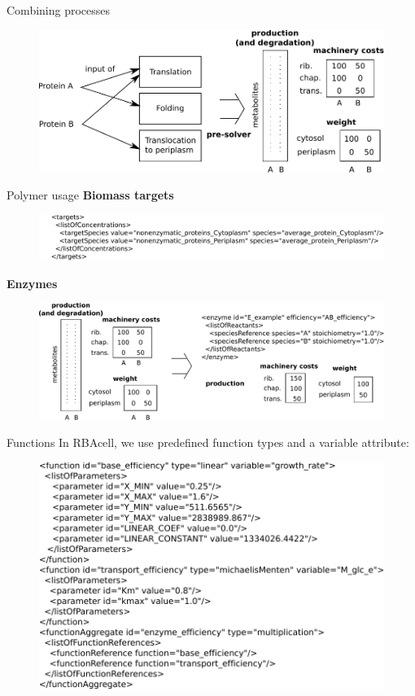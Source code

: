 \documentclass{beamer}
\begin{document}
\begin{frame}{Combining processes}
  \begin{figure}
    \centering
    \includegraphics[width=\linewidth]{combining_processes}
  \end{figure}
\end{frame}

\begin{frame}{Polymer usage}
  \textbf{Biomass targets}
  \begin{figure}
    \centering
    \includegraphics[width=\linewidth]{targets}
  \end{figure}
  \textbf{Enzymes}
  \begin{figure}
    \centering
    \includegraphics[width=\linewidth]{enzyme}
  \end{figure}
\end{frame}

\begin{frame}{Functions}
  In RBAcell, we use predefined function types and a variable attribute:
  \begin{figure}
    \centering
    \includegraphics[width=\linewidth]{functions}
  \end{figure}
\end{frame}
\end{document}
